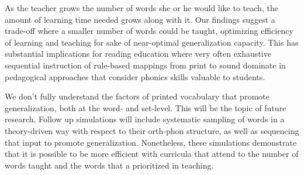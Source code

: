 \documentclass[10pt,letterpaper]{article}
\begin{document}
As the teacher grows the number of words she or he would like to teach, the amount of learning time needed grows along with it. Our findings suggest a trade-off where a smaller number of words could be taught, optimizing efficiency of learning and teaching for sake of near-optimal generalization capacity. This has substantial implications for reading education where very often exhaustive sequential instruction of rule-based mappings from print to sound dominate in pedagogical approaches that consider phonics skills valuable to students.

We don't fully understand the factors of printed vocabulary that promote generalization, both at the word- and set-level. This will be the topic of future research. Follow up simulations will include systematic sampling of words in a theory-driven way with respect to their orth-phon structure, as well as sequencing that input to promote generalization. Nonetheless, these simulations demonstrate that it is possible to be more efficient with curricula that attend to the number of words taught and the words that a prioritized in teaching.






\setlength{\bibleftmargin}{.125in}
\setlength{\bibindent}{-\bibleftmargin}


\end{document}
